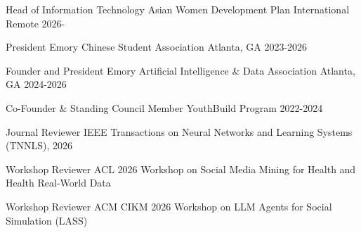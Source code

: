 
\begin{cvhonors}
  \cvhonor
    {Head of Information Technology} %
    {Asian Women Development Plan International} %
    {Remote} %
    {2026-} %

  \cvhonor
    {President} %
    {Emory Chinese Student Association} %
    {Atlanta, GA} %
    {2023-2026} %
    
  \cvhonor
    {Founder and President} %
    {Emory Artificial Intelligence \& Data Association} %
    {Atlanta, GA} %
    {2024-2026} %

  \cvhonor
    {Co-Founder \& Standing Council Member} %
    {YouthBuild Program} %
    {} %
    {2022-2024} %
    
\end{cvhonors}

\begin{cvreviews}
  \cvreview
    {Journal Reviewer} %
    {IEEE Transactions on Neural Networks and Learning Systems (TNNLS), 2026} %

  \cvreview
    {Workshop Reviewer} %
    {ACL 2026 Workshop on Social Media Mining for Health and Health Real-World Data} %

  \cvreview
    {Workshop Reviewer} %
    {ACM CIKM 2026 Workshop on LLM Agents for Social Simulation (LASS)} %
\end{cvreviews}
